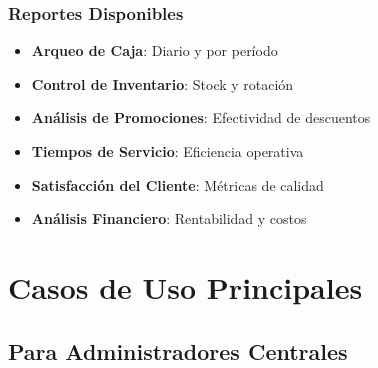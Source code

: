 \documentclass[12pt,a4paper]{article}
\begin{document}
\subsubsection{Reportes Disponibles}
\begin{itemize}
    \item \textbf{Arqueo de Caja}: Diario y por período
    \item \textbf{Control de Inventario}: Stock y rotación
    \item \textbf{Análisis de Promociones}: Efectividad de descuentos
    \item \textbf{Tiempos de Servicio}: Eficiencia operativa
    \item \textbf{Satisfacción del Cliente}: Métricas de calidad
    \item \textbf{Análisis Financiero}: Rentabilidad y costos
\end{itemize}

\section{Casos de Uso Principales}

\subsection{Para Administradores Centrales}
\end{document}
